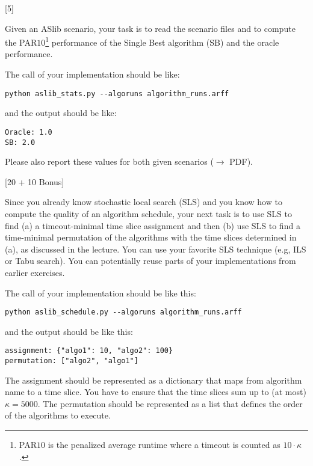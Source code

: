 \documentclass{exam}
\begin{document}
\begin{questions}


[5]

Given an ASlib scenario, your task is to read the scenario files
and to compute the PAR$10$\footnote{PAR$10$ is the penalized average runtime where a timeout is counted as $10 \cdot \kappa$.} performance of the Single Best algorithm (SB) and the oracle performance.

The call of your implementation should be like:

\begin{verbatim}
python aslib_stats.py --algoruns algorithm_runs.arff
\end{verbatim}

and the output should be like:

\begin{verbatim}
Oracle: 1.0
SB: 2.0
\end{verbatim}

Please also report these values for both given scenarios ($\to$ PDF).

[20 + 10 Bonus]

Since you already know stochastic local search (SLS) and you know how to compute the quality of an algorithm schedule,
your next task is to use SLS to find (a) a timeout-minimal time slice assignment and then (b) use SLS to find a time-minimal permutation of the algorithms with the time slices determined in (a), as discussed in the lecture.
You can use your favorite SLS technique (e.g, ILS or Tabu search). You can potentially reuse parts of your implementations from earlier exercises.
 
The call of your implementation should be like this:

\begin{verbatim}
python aslib_schedule.py --algoruns algorithm_runs.arff
\end{verbatim}

and the output should be like this:

\begin{verbatim}
assignment: {"algo1": 10, "algo2": 100}
permutation: ["algo2", "algo1"]
\end{verbatim}

The assignment should be represented as a dictionary that maps from algorithm name to a time slice.
You have to ensure that the time slices sum up to (at most) $\kappa = 5000$.
The permutation should be represented as a list that defines the order of the algorithms to execute.


\end{questions}
\end{document}
